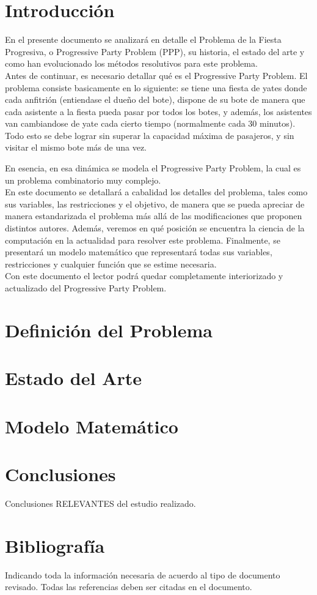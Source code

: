 \documentclass[letter, 10pt]{article}
\begin{document}
\section{Introducción}
En el presente documento se analizará en detalle el Problema de la Fiesta Progresiva, o Progressive Party Problem (PPP), su historia, el estado del arte y como han evolucionado los métodos resolutivos para este problema.\\

Antes de continuar, es necesario detallar qué es el Progressive Party Problem. El problema consiste basicamente en lo siguiente: se tiene una fiesta de yates donde cada anfitrión (entiendase el dueño del bote), dispone de su bote de manera que cada asistente a la fiesta pueda pasar por todos los botes, y además, los asistentes van cambiandose de yate cada cierto tiempo (normalmente cada 30 minutos). Todo esto se debe lograr sin superar la capacidad máxima de pasajeros, y sin visitar el mismo bote más de una vez.

En esencia, en esa dinámica se modela el Progressive Party Problem, la cual es un problema combinatorio muy complejo.\\

En este documento se detallará a cabalidad los detalles del problema, tales como sus variables, las restricciones y el objetivo, de manera que se pueda apreciar de manera estandarizada el problema más allá de las modificaciones que proponen distintos autores. Además, veremos en qué posición se encuentra la ciencia de la computación en la actualidad para resolver este problema. Finalmente, se presentará un modelo matemático que representará todas sus variables, restricciones y cualquier función que se estime necesaria.\\

Con este documento el lector podrá quedar completamente interiorizado y actualizado del Progressive Party Problem.

\section{Definición del Problema}
\cite{FirstPublication}

\section{Estado del Arte}

\section{Modelo Matemático}

\section{Conclusiones}
Conclusiones RELEVANTES del estudio realizado.

\section{Bibliograf\'ia}
Indicando toda la informaci\'on necesaria de acuerdo al tipo de documento revisado. Todas las referencias deben ser 
citadas en el documento.


\end{document}
